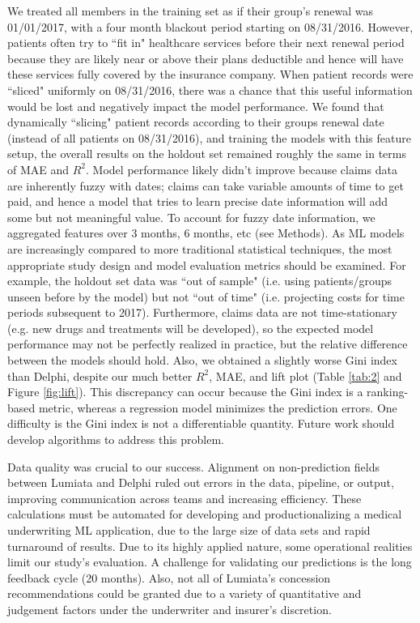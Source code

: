 \documentclass[letterpaper]{article} %
\begin{document}
We treated all members in the training set as if their group's renewal was 01/01/2017, with a four month blackout period starting on 08/31/2016. However, patients often try to ``fit in" healthcare services before their next renewal period because they are likely near or above their plans deductible and hence will have these services fully covered by the insurance company. When patient records were ``sliced" uniformly on 08/31/2016, there was a chance that this useful information would be lost and negatively impact the model performance. We found that dynamically ``slicing" patient records according to their groups renewal date (instead of all patients on 08/31/2016), and training the models with this feature setup, the overall results on the holdout set remained roughly the same in terms of MAE and $R^2$. Model performance likely didn't improve because claims data are inherently fuzzy with dates; claims can take variable amounts of time to get paid, and hence a model that tries to learn precise date information will add some but not meaningful value. To account for fuzzy date information, we aggregated features over 3 months, 6 months, etc (see Methods).  As ML models are increasingly compared to more traditional statistical techniques, the most appropriate study design and model evaluation metrics should be examined. For example, the holdout set data was ``out of sample" (i.e. using patients/groups unseen before by the model) but not ``out of time" (i.e. projecting costs for time periods subsequent to 2017).  Furthermore, claims data are not time-stationary (e.g. new drugs and treatments will be developed), so the expected model performance may not be perfectly realized in practice, but the relative difference between the models should hold. Also, we obtained a slightly worse Gini index than Delphi, despite our much better $R^2$, MAE, and lift plot (Table \ref{tab:2} and Figure \ref{fig:lift}).  This discrepancy can occur because the Gini index is a ranking-based metric, whereas a regression model minimizes the prediction errors. One difficulty is the Gini index is not a differentiable quantity. Future work should develop algorithms to address this problem.

Data quality was crucial to our success. Alignment on non-prediction fields between Lumiata and Delphi ruled out errors in the data, pipeline, or output, improving communication across teams and increasing efficiency. These calculations must be automated for developing and productionalizing a medical underwriting ML application, due to the large size of data sets and rapid turnaround of results.  Due to its highly applied nature, some operational realities limit our study's evaluation. A challenge for validating our predictions is the long feedback cycle (20 months). Also, not all of Lumiata's concession recommendations could be granted due to a variety of quantitative and judgement factors under the underwriter and insurer's discretion.
\end{document}
